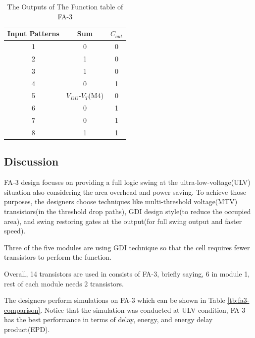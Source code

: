 \documentclass[conference]{IEEEtran}
\begin{document}
\begin{table}[!ht]
	\renewcommand{\arraystretch}{1.3}
	\caption{The Outputs of The Function table of FA-3}
	\centering
	\begin{tabular}{ c c c }
		\hline
		Input Patterns & Sum                    & \(C_{out}\) \\
		\hline
		1              & 0                      & 0           \\
		2              & 1                      & 0           \\
		3              & 1                      & 0           \\
		4              & 0                      & 1           \\
		5              & \(V_{DD}\)-\(V_T\)(M4) & 0           \\
		6              & 0                      & 1           \\
		7              & 0                      & 1           \\
		8              & 1                      & 1           \\
		\hline
	\end{tabular}
	\label{tb:fa3-func-pattern-out}
\end{table}

\subsection{Discussion}

FA-3 design focuses on providing a full logic swing at the ultra-low-voltage(ULV) situation also considering the area overhead and power saving.
To achieve those purposes, the designers choose techniques like multi-threshold voltage(MTV) transistors(in the threshold drop paths),
GDI design style(to reduce the occupied area), and swing restoring gates at the output(for full swing output and faster speed).

Three of the five modules are using GDI technique so that the cell requires fewer transistors to perform the function.

Overall, 14 transistors are used in consists of FA-3, briefly saying, 6 in module 1, rest of each module needs 2 transistors.

The designers perform simulations on FA-3 which can be shown in Table \ref{tb:fa3-comparison}.
Notice that the simulation was conducted at ULV condition, FA-3 has the best performance in terms of delay, energy, and energy delay product(EPD).
\end{document}
